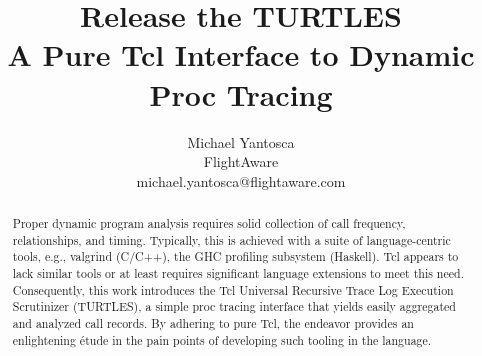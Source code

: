 \documentclass{article}[letter,10pt]
\title{Release the TURTLES\\
  \large{A Pure Tcl Interface to Dynamic Proc Tracing}}
\author{
  Michael Yantosca\\
  FlightAware \\
  michael.yantosca@flightaware.com
}
\begin{document}
\maketitle

\begin{abstract}
  Proper dynamic program analysis requires solid collection of call frequency,
  relationships, and timing. Typically, this is achieved with a suite of
  language-centric tools, e.g., valgrind (C/C++), the GHC profiling subsystem
  (Haskell). Tcl appears to lack similar tools or at least requires significant
  language extensions to meet this need. Consequently, this work introduces
  the Tcl Universal Recursive Trace Log Execution Scrutinizer (TURTLES), a
  simple proc tracing interface that yields easily aggregated and analyzed
  call records. By adhering to pure Tcl, the endeavor provides an enlightening
  étude in the pain points of developing such tooling in the language.
\end{abstract}
\end{document}
